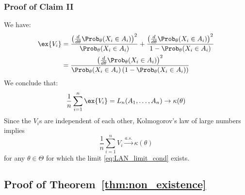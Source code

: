 \subsubsection*{Proof of Claim II} 
We have:
\begin{align*}
\ex{ V_i}  & = 
 \frac{ \left(\frac{d}{d\theta} \Prob_{\theta}(X_i \in A_i) \right)^2}{\Prob_{\theta}(X_i \in A_i)}  
+ 
 \frac{ \left(\frac{d}{d\theta} \Prob_{\theta}(X_i \in A_i) \right)^2}{1-\Prob_{\theta}(X_i \in A_i)}  \\
 & = 
  \frac{ \left(\frac{d}{d\theta} \Prob_{\theta}(X_i \in A_i) \right)^2}{\Prob_{\theta}(X_i \in A_i) \left( 1-\Prob_{\theta}(X_i \in A_i) \right)}  
\end{align*}
 We conclude that:
\begin{equation} \label{eq:LAN_limit_cond}
\frac{1}{n} \sum_{i=1}^n \ex{ V_i} =   L_n(A_1,\ldots,A_n)  \to \kappa(\theta)
\end{equation}
Since the $V_i$s are independent of each other, Kolmogorov's law of large numbers implies
\[
\frac{1}{n} \sum_{i=1}^n  V_i \overset{a.s.}{\longrightarrow} \kappa(\theta)
\]
for any $\theta \in \Theta$ for which the limit \eqref{eq:LAN_limit_cond} exists.
\QEDA


\subsection{Proof of Theorem~\ref{thm:non_existence}
\label{proof:thm:non_existence}
}

